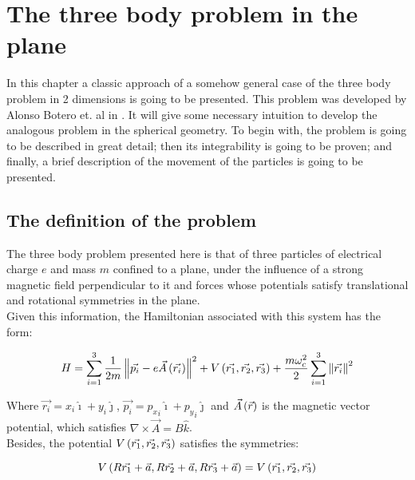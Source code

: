 \chapter{The three body problem in the plane}

In this chapter a classic approach of a somehow general case of the three body problem in 2 dimensions is going to be presented. This problem was developed by Alonso Botero et. al in \cite{alonso}. It will give some necessary intuition to develop the analogous problem in the spherical geometry. To begin with, the problem is going to be described in great detail; then its integrability is going to be proven; and finally, a brief description of the movement of the particles is going to be presented.\\

\section{The definition of the problem}

The three body problem presented here is that of three particles of electrical charge $e$ and mass $m$ confined to a plane, under the influence of a strong magnetic field perpendicular to it and forces whose potentials satisfy translational and rotational symmetries in the plane.\\

Given this information, the Hamiltonian associated with this system has the form:

\begin{equation}
H = \sum_{i=1}^{3} \frac{1}{2m} \left\lVert  \vec{p_i} - 
e\vec{ A } \left( \vec{r_i} \right) \right\rVert^2
+ V \left(  \vec{r_1},\vec{r_2},\vec{r_3}  \right)
+\frac{m\omega_c^2}{2}\sum_{i=1}^{3} \left\lVert \vec{r_i} \right\rVert^2
\label{eq:ham2d}
\end{equation}

Where $\vec{r_i} = x_i \hat{\imath} + y_i \hat{\jmath}$, $\vec{p_i} = {p_x}_i\hat{\imath} + {p_y}_i\hat{\jmath}$ and $\vec{A}\left( \vec{r} \right)$ is the magnetic vector potential, which satisfies $\nabla \times \vec{A} = B\hat{k}$.\\

Besides, the potential $V \left(  \vec{r_1},\vec{r_2},\vec{r_3}  \right)$ satisfies the symmetries:

\begin{equation}
V \left(  R\vec{r_1}+\vec{a},R\vec{r_2}+\vec{a},R\vec{r_3}+\vec{a}   \right)= V \left(  \vec{r_1},\vec{r_2},\vec{r_3}  \right)
\label{eq:vsym}
\end{equation}

